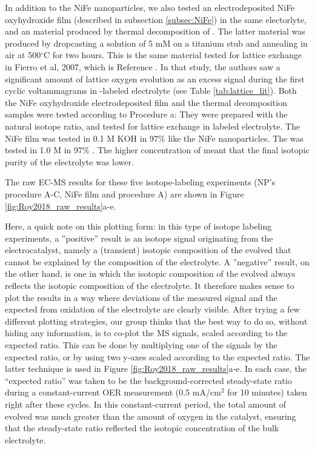 In addition to the NiFe nanoparticles, we also tested an electrodeposited NiFe oxyhydroxide film (described in subsection \ref{subsec:NiFe}) in the same electorlyte, and an  material produced by thermal decomposition of . The latter material was produced by dropcasting a solution of 5 mM  on a titanium stub and annealing in air at 500$^\circ$C for two hours. This is the same material tested for lattice exchange in Fierro et al, 2007, which is Reference \cite{Fierro2007}. In that study, the authors saw a significant amount of lattice oxygen evolution as an excess  signal during the first cyclic voltammagrams in -labeled electrolyte (see Table \ref{tab:lattice_lit}). Both the NiFe oxyhydroxide electrodeposited film and the thermal decomposition  samples were tested according to Procedure a: They were prepared with the natural isotope ratio, and tested for lattice exchange in labeled electrolyte. The NiFe film was tested in 0.1 M KOH in 97\%  like the NiFe nanoparticles. The  was tested in 1.0 M  in 97\% . The higher concentration of  meant that the final isotopic purity of the electrolyte was lower.

The raw EC-MS results for these five isotope-labeling experiments (NP's procedure A-C, NiFe film and  procedure A) are shown in Figure \ref{fig:Roy2018_raw_results}a-e. 

Here, a quick note on this plotting form: in this type of isotope labeling experiments, a ''positive'' result is an isotope signal originating from the electrocatalyst, namely a (transient) isotopic composition of the evolved  that cannot be explained by the composition of the electrolyte. A ''negative'' result, on the other hand, is one in which the isotopic composition of the evolved  always reflects the isotopic composition of the electrolyte. It therefore makes sense to plot the results in a way where deviations of the measured  signal and the expected  from oxidation of the electrolyte are clearly visible. After trying a few different plotting strategies, our group thinks that the best way to do so, without hiding any information, is to co-plot the MS signals, scaled according to the expected ratio. This can be done by multiplying one of the signals by the expected ratio, or by using two y-axes scaled according to the expected ratio. The latter technique is used in Figure \ref{fig:Roy2018_raw_results}a-e. In each case, the ``expected ratio'' was taken to be the background-corrected steady-state ratio during a constant-current OER measurement (0.5 mA/cm$^2$ for 10 minutes) taken right after these cycles. In this constant-current period, the total amount of  evolved was much greater than the amount of oxygen in the catalyst, ensuring that the steady-state ratio reflected the isotopic concentration of the bulk electrolyte.

